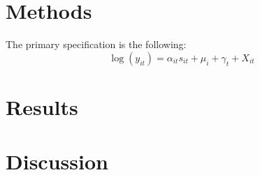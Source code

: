\documentclass{article}
\newcommand\wordcount{}
\begin{document}
\section{Methods}
The primary specification is the following:
\[\log (y_{it}) = \alpha_{it} s_{it} + \mu_i + \gamma_t + X_{it} \]
\section{Results}

\section{Discussion}

\wordcount
\printbibliography
\end{document}
